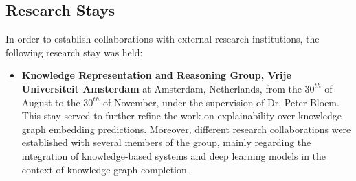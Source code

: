 \subsection{Research Stays}
In order to establish collaborations with external research institutions, the following research stay was held:
\begin{itemize}
    \item \textbf{Knowledge Representation and Reasoning Group, Vrije Universiteit Amsterdam} at Amsterdam, Netherlands, from the $30^{th}$ of August to the $30^{th}$ of November, under the supervision of Dr. Peter Bloem. This stay served to further refine the work on explainability over knowledge-graph embedding predictions. Moreover, different research collaborations were established with several members of the group, mainly regarding the integration of knowledge-based systems and deep learning models in the context of knowledge graph completion.
\end{itemize}